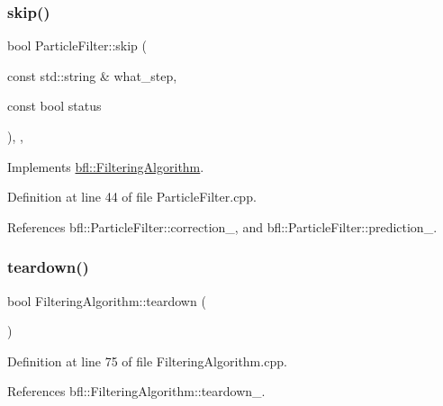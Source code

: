 \subsubsection{\texorpdfstring{skip()}{skip()}}
{\footnotesize\ttfamily bool Particle\+Filter\+::skip (\begin{DoxyParamCaption}\item[{const std\+::string \&}]{what\+\_\+step,  }\item[{const bool}]{status }\end{DoxyParamCaption})\hspace{0.3cm}{\ttfamily [override]}, {\ttfamily [virtual]}, {\ttfamily [inherited]}}



Implements \mbox{\hyperlink{classbfl_1_1FilteringAlgorithm_ac8a718a614905d89d6a43bbbc70d68b2}{bfl\+::\+Filtering\+Algorithm}}.



Definition at line 44 of file Particle\+Filter.\+cpp.



References bfl\+::\+Particle\+Filter\+::correction\+\_\+, and bfl\+::\+Particle\+Filter\+::prediction\+\_\+.

\mbox{\label{classbfl_1_1FilteringAlgorithm_a1dc912d89ee8f96d4f3e8209865c5308}} 
\subsubsection{\texorpdfstring{teardown()}{teardown()}}
{\footnotesize\ttfamily bool Filtering\+Algorithm\+::teardown (\begin{DoxyParamCaption}{ }\end{DoxyParamCaption})\hspace{0.3cm}{\ttfamily [inherited]}}



Definition at line 75 of file Filtering\+Algorithm.\+cpp.



References bfl\+::\+Filtering\+Algorithm\+::teardown\+\_\+.

\mbox{\label{classbfl_1_1FilteringAlgorithm_a40372c24fa050eb0274371172df0a244}} 

